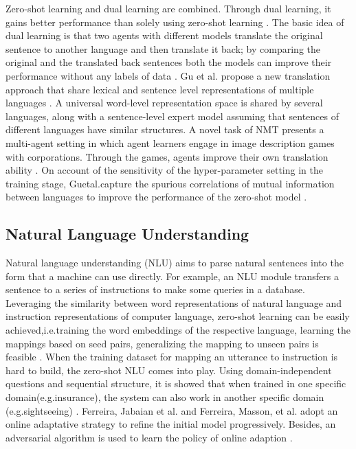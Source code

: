 \documentclass[sigconf, review]{acmart}
\begin{document}
Zero-shot learning and dual learning are combined. Through dual learning, it gains better performance than solely using zero-shot learning \cite{sestorain2018zero,gu2018universal}. The basic idea of dual learning is that two agents with different models translate the original sentence to another language and then translate it back; by comparing the original and the translated back sentences both the models can improve their performance without any labels of data \cite{he2016dual}. Gu et al. propose a new translation approach that share lexical and sentence level representations of multiple languages \cite{gu2018universal}. A universal word-level representation space is shared by several languages, along with a sentence-level expert model assuming that sentences of different languages have similar structures.  A novel task of NMT presents a multi-agent setting in which agent learners engage in image description games with corporations.  Through the games, agents improve their own translation ability \cite{chen2018zero}. On account of the sensitivity of the hyper-parameter setting in the training stage, Guetal.capture the spurious correlations of mutual information between languages to improve the performance of the zero-shot model \cite{gu2019improved}.

\subsection{Natural Language Understanding}
Natural language understanding (NLU) aims to parse natural sentences into the form that a machine can use directly. For example, an NLU module transfers a sentence to a series of instructions to make some queries in a database. Leveraging the similarity between word representations of natural language and instruction representations of computer language, zero-shot learning can be easily achieved,i.e.training the word embeddings of the respective language, learning the mappings based on seed pairs, generalizing the mapping to unseen pairs is feasible \cite{ferreira2015zero, yazdani2015model}. When the training dataset for mapping an utterance to instruction is hard to build, the zero-shot NLU comes into play. Using domain-independent questions and sequential structure, it is showed that when trained in one specific domain(e.g.insurance), the system can also work in another specific domain (e.g.sightseeing) \cite{sadamitsu2017zero,bapna2017towards,herzig2018decoupling, lee2019zero}. Ferreira, Jabaian et al. \cite{ferreira2015online} and Ferreira, Masson, et al. \cite{ferreira2016adversarial} adopt an online adaptative strategy to refine the initial model progressively. Besides, an adversarial algorithm is used to learn the policy of online adaption \cite{ferreira2016adversarial}.
\end{document}
